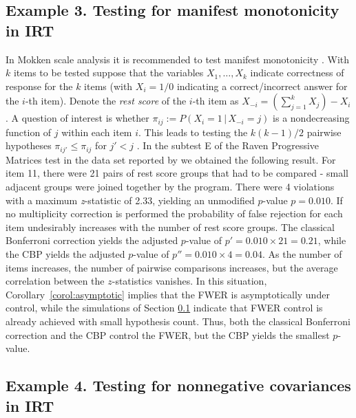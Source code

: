 \documentclass {imsart}
\begin{document}
\subsection{Example 3. Testing for manifest monotonicity in IRT}\label{manifest}

In Mokken scale analysis it is recommended to test manifest monotonicity \citep{Ark2007}. With $k$ items to be tested suppose that the variables $X_1,\ldots,X_k$ indicate correctness of response for the $k$ items (with $X_i=1/0$ indicating a correct/incorrect answer for the $i$-th item). Denote the \textit{rest score} of the $i$-th item as $X_{-i}=(\sum_{j=1}^{k}X_j)-X_i$. A question of interest is whether $\pi_{ij}:=P(X_i=1\,|\,X_{-i}=j)$ is a nondecreasing function of $j$ within each item $i$. This leads to testing the $k(k-1)/2$ pairwise hypotheses $\pi_{ij'}\leq\pi_{ij}$ for $j'<j$ \citep{Ark2007}. In the subtest E of the Raven Progressive Matrices test in the data set reported by \citet{VE2000} we obtained the following result. For item 11, there were 21 pairs of rest score groups that had to be compared - small adjacent groups were joined together by the program. There were 4 violations with a maximum  \textit{z}-statistic of 2.33, yielding an unmodified $p$-value $p = 0.010$. If no multiplicity correction is performed the probability of false rejection for each item undesirably increases with the number of rest score groups. The classical Bonferroni correction yields the adjusted $p$-value of $p'=0.010\times 21=0.21$, while the CBP yields the adjusted $p$-value of $p''=0.010\times 4=0.04$. As the number of items increases, the number of pairwise comparisons increases, but the average correlation between the $z$-statistics vanishes. In this situation, Corollary~\ref{corol:asymptotic} implies that the FWER is asymptotically under control, while the simulations of Section \ref{manifest} indicate that FWER control is already achieved with small hypothesis count. Thus, both the classical Bonferroni correction and the CBP control the FWER, but the CBP yields the smallest $p$-value.


\subsection{Example 4. Testing for nonnegative covariances in IRT}
\end{document}
